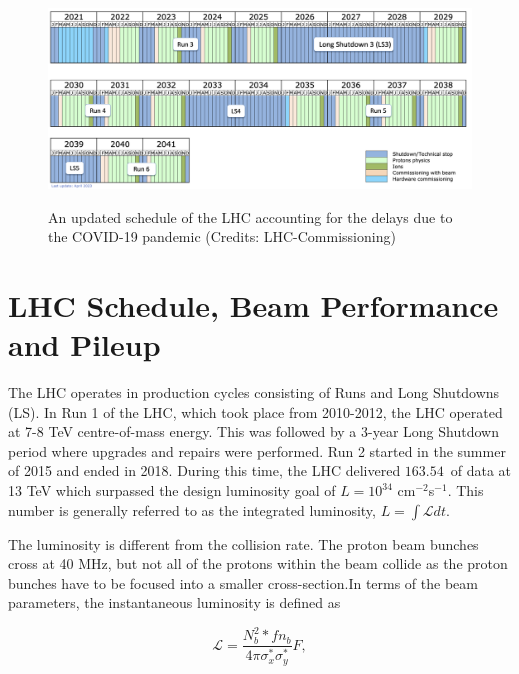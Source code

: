 \begin{figure}[!htbp]
	\centering
 	\caption{An updated schedule of the LHC accounting for the delays due to the COVID-19 pandemic (Credits: LHC-Commissioning)}
	\includegraphics[scale=0.3]{fig/HL-LHC.png}
	\label{fig:lhcschedule}
\end{figure}

\section{LHC Schedule, Beam Performance and Pileup}

The LHC operates in production cycles consisting of Runs and Long Shutdowns (LS). In Run 1 of the LHC, which took place from 2010-2012, the LHC operated at 7-8 TeV centre-of-mass energy. This was followed by a 3-year Long Shutdown period where upgrades and repairs were performed. Run 2 started in the summer of 2015 and ended in 2018. During this time, the LHC delivered $163.54$~\fbinv  of data at 13 TeV which surpassed the design luminosity goal of $L = 10^{34}$ cm$^{-2}$s$^{-1}$. This number is generally referred to as the integrated luminosity, $L = \int \mathcal{L} dt$.

The luminosity is different from the collision rate. The proton beam bunches cross at 40 MHz, but not all of the protons within the beam collide as the proton bunches have to be focused into a smaller cross-section.In terms of the beam parameters, the instantaneous luminosity is defined as 

\begin{equation} \label{eq:beamParam}
    \mathcal{L} = \frac{N^2_{b}*fn_{b}}{4\pi\sigma^{*}_{x}\sigma^{*}_{y}}F,
\end{equation}

